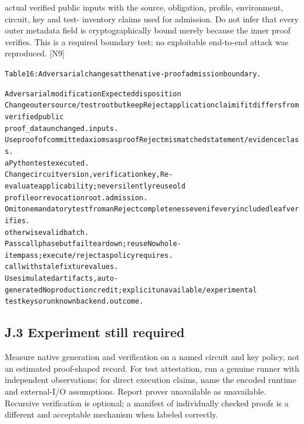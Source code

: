 actual verified public inputs with the source, obligation, profile, environment, circuit, key and test-
inventory claims used for admission. Do not infer that every outer metadata field is cryptographically
bound merely because the inner proof verifies. This is a required boundary test; no exploitable
end-to-end attack was reproduced. [N9]

\begingroup\fontsize{7}{8.4}\selectfont
\begin{alltt}
Table 16: Adversarial changes at the native-proof admission boundary.
\end{alltt}\endgroup

\begingroup\fontsize{7}{8.4}\selectfont
\begin{alltt}
Adversarial modification                    Expected disposition
Change outer source/test root but keep      Reject application claim if it differs from verified public
proof\_data unchanged.                       inputs.
Use proof of committed axioms as proof      Reject mismatched statement/evidence class.
a Python test executed.
Change circuit version, verification key,   Re-evaluate applicability; never silently reuse old
profile or revocation root.                 admission.
Omit one mandatory test from an             Reject completeness even if every included leaf verifies.
otherwise valid batch.
Pass call phase but fail teardown; reuse    No whole-item pass; execute/reject as policy requires.
call with stale fixture values.
Use simulated artifacts, auto-generated     No production credit; explicit unavailable/experimental
test keys or unknown backend.               outcome.
\end{alltt}\endgroup


\subsection*{J.3 Experiment still required}

Measure native generation and verification on a named circuit and key policy, not an estimated
proof-shaped record. For test attestation, run a genuine runner with independent observations; for
direct execution claims, name the encoded runtime and external-I/O assumptions. Report prover
unavailable as unavailable. Recursive verification is optional; a manifest of individually checked
proofs is a different and acceptable mechanism when labeled correctly.

